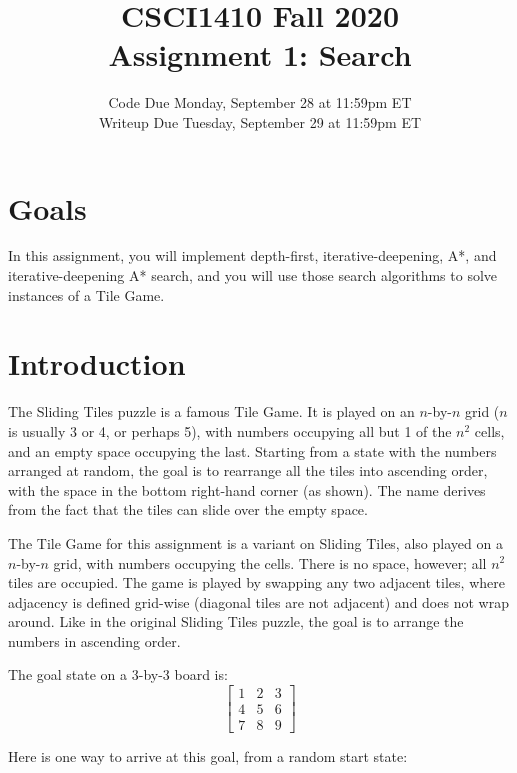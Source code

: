 \documentclass{article}
\title{CSCI1410 Fall 2020 \\
Assignment 1: Search}
\date{Code Due Monday, September 28 at 11:59pm ET\\ [1ex]
Writeup Due Tuesday, September 29 at 11:59pm ET}
\begin{document}
\maketitle


\section{Goals}

In this assignment, you will implement depth-first,
iterative-deepening, A*, and iterative-deepening A* search,
and you will use those search algorithms to solve instances of a Tile Game.


\section{Introduction}

The Sliding Tiles puzzle is a famous Tile Game.
It is played on an $n$-by-$n$ grid ($n$ is usually 3 or 4, or perhaps 5),
with numbers occupying all but 1 of the $n^2$ cells,
and an empty space occupying the last.
Starting from a state with the numbers arranged at random,
the goal is to rearrange all the tiles into ascending order,
with the space in the bottom right-hand corner (as shown).
The name derives from the fact that the tiles can slide over the empty space.

The Tile Game for this assignment is a variant on Sliding Tiles,
also played on a $n$-by-$n$ grid, with numbers occupying the cells.
There is no space, however; all $n^2$ tiles are occupied.
The game is played by swapping any two adjacent tiles,
where adjacency is defined grid-wise (diagonal tiles are not adjacent) and does not wrap around.
Like in the original Sliding Tiles puzzle,
the goal is to arrange the numbers in ascending order.

The goal state on a 3-by-3 board is:
\[
\begin{bmatrix}
1 & 2 & 3 \\
4 & 5 & 6 \\
7 & 8 & 9
\end{bmatrix}
\]

Here is one way to arrive at this goal, from a random start state: \\
\end{document}
